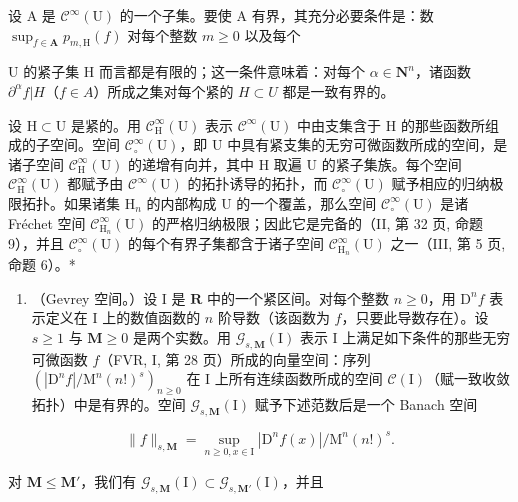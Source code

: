 设 A 是 \(\mathcal{C}^{\infty}(\mathrm{U})\) 的一个子集。要使 A 有界，其充分必要条件是：数 \(\sup_{f\in \mathbf{A}}p_{m,\mathrm{H}}(f)\) 对每个整数 \(m\geqslant 0\) 以及每个

  U 的紧子集 H 而言都是有限的；这一条件意味着：对每个 \(\alpha\in \mathbf{N}^{n}\)，诸函数 \(\partial^{\alpha}f|H\)（\(f\in A\)）所成之集对每个紧的 \(H\subset U\) 都是一致有界的。

设 \(\mathrm{H} \subset \mathrm{U}\) 是紧的。用 \(\mathcal{C}_{\mathrm{H}}^{\infty}(\mathrm{U})\) 表示 \(\mathcal{C}^{\infty}(\mathrm{U})\) 中由支集含于 \(\mathrm{H}\) 的那些函数所组成的子空间。空间 \(\mathcal{C}_{\circ}^{\infty}(\mathrm{U})\)，即 \(\mathrm{U}\) 中具有紧支集的无穷可微函数所成的空间，是诸子空间 \(\mathcal{C}_{\mathrm{H}}^{\infty}(\mathrm{U})\) 的递增有向并，其中 \(\mathrm{H}\) 取遍 \(\mathrm{U}\) 的紧子集族。每个空间 \(\mathcal{C}_{\mathrm{H}}^{\infty}(\mathrm{U})\) 都赋予由 \(\mathcal{C}^{\infty}(\mathrm{U})\) 的拓扑诱导的拓扑，而 \(\mathcal{C}_{\circ}^{\infty}(\mathrm{U})\) 赋予相应的归纳极限拓扑。如果诸集 \(\mathrm{H}_n\) 的内部构成 \(\mathrm{U}\) 的一个覆盖，那么空间 \(\mathcal{C}_{\circ}^{\infty}(\mathrm{U})\) 是诸 Fréchet 空间 \(\mathcal{C}_{\mathrm{H}_n}^\infty (\mathrm{U})\) 的严格归纳极限；因此它是完备的（II, 第 32 页, 命题 9），并且 \(\mathcal{C}_{\circ}^{\infty}(\mathrm{U})\) 的每个有界子集都含于诸子空间 \(\mathcal{C}_{\mathrm{H}_n}^\infty (\mathrm{U})\) 之一（III, 第 5 页, 命题 6）。*

\begin{enumerate}
\def\labelenumi{\alph{enumi})}
\setcounter{enumi}{2}
\tightlist
\item
  （Gevrey 空间。）设 I 是 \(\mathbf{R}\) 中的一个紧区间。对每个整数 \(n \geqslant 0\)，用 \(\mathrm{D}^n f\) 表示定义在 I 上的数值函数的 \(n\) 阶导数（该函数为 \(f\)，只要此导数存在）。设 \(s \geqslant 1\) 与 \(\mathbf{M} \geqslant 0\) 是两个实数。用 \(\mathcal{G}_{s,\mathbf{M}}(\mathrm{I})\) 表示 I 上满足如下条件的那些无穷可微函数 \(f\)（FVR, I, 第 28 页）所成的向量空间：序列 \((|\mathrm{D}^n f| / \mathrm{M}^n (n!)^s)_{n \geqslant 0}\) 在 I 上所有连续函数所成的空间 \(\mathcal{C}(\mathrm{I})\)（赋一致收敛拓扑）中是有界的。空间 \(\mathcal{G}_{s,\mathbf{M}}(\mathrm{I})\) 赋予下述范数后是一个 Banach 空间
\end{enumerate}

\[
\| f \| _ {s, \mathbf {M}} = \sup _ {n \geqslant 0, x \in \mathrm{I}} | \mathrm{D} ^ {n} f (x) | / \mathrm{M} ^ {n} (n!) ^ {s}.
\]

对 \(\mathbf{M} \leqslant \mathbf{M}'\)，我们有 \(\mathcal{G}_{s,\mathbf{M}}(\mathrm{I}) \subset \mathcal{G}_{s,\mathbf{M}'}(\mathrm{I})\)，并且


